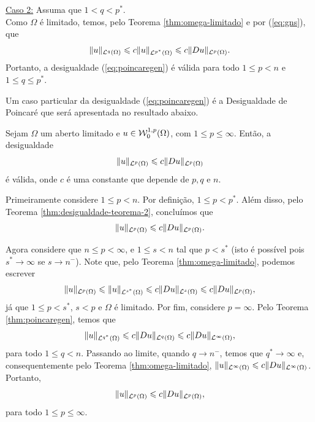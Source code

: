 \begin{prf}
    \underline{Caso 2:} Assuma que $1 < q < p^*$.\\
    Como $\Omega$ é limitado, temos, pelo Teorema \ref{thm:omega-limitado} e por (\ref{eq:gns}), que
    \[
        \Vert u \Vert_{\mathcal{L}^q(\Omega)} \leqslant c\Vert u \Vert_{\mathcal{L}^{p^*}(\Omega)} \leqslant c \Vert Du \Vert_{\mathcal{L}^p(\Omega)}.
    \]
    Portanto, a desigualdade (\ref{eq:poincaregen}) é válida para todo $1 \leqslant p < n$ e $1 \leqslant q \leqslant p^*$.
\end{prf}

Um caso particular da desigualdade (\ref{eq:poincaregen}) é a Desigualdade de Poincaré que será apresentada no resultado abaixo.

\begin{cbox} \label{cl:poincare}
   Sejam $\Omega$ um aberto limitado e $u \in \mathcal{W}^{1,p}_0(\Omega)$, com $1 \leqslant p \leqslant \infty$. Então, a desigualdade
   \[
        \Vert u \Vert_{\mathcal{L}^p(\Omega)} \leqslant c\Vert Du \Vert_{\mathcal{L}^p(\Omega)}
   \]
   é válida,
   onde $c$ é uma constante que depende de $p, q$ e $n$.
\end{cbox}
\begin{prf}
    Primeiramente considere $1 \leqslant p < n$.
    Por definição, $1 \leqslant p < p^*$. Além disso, pelo Teorema \ref{thm:desigualdade-teorema-2}, concluímos que
    \[
        \Vert u \Vert_{\mathcal{L}^p(\Omega)} \leqslant c \Vert Du \Vert_{\mathcal{L}^p(\Omega)}.
    \]

    Agora considere que $n \leqslant p < \infty$, e $1 \leqslant s < n$ tal que $p < s^*$ (isto é possível pois $s^* \to \infty$ se $s \to n^-$).
    Note que, pelo Teorema \ref{thm:omega-limitado}, podemos escrever
    \[
        \Vert u \Vert_{\mathcal{L}^p(\Omega)} \leqslant \Vert u \Vert_{\mathcal{L}^{s^*}(\Omega)} \leqslant c \Vert Du \Vert_{\mathcal{L}^s(\Omega)} \leqslant c \Vert Du \Vert_{\mathcal{L}^p(\Omega)},
    \]
    já que $1 \leqslant p < s^*$, $s < p$ e $\Omega$ é limitado.
    Por fim, considere $p = \infty$.
    Pelo Teorema \ref{thm:poincaregen}, temos que
    \[
        \Vert u \Vert_{\mathcal{L}^{q^*}(\Omega)} \leqslant c \Vert Du \Vert_{\mathcal{L}^{q}(\Omega)} \leqslant c \Vert Du \Vert_{\mathcal{L}^\infty(\Omega)},
    \]
    para todo $1 \leqslant q < n$.
    Passando ao limite, quando $q \to n^-$, temos que $q^* \to \infty$ e, consequentemente pelo Teorema \ref{thm:omega-limitado}, $\Vert u \Vert_{\mathcal{L}^\infty(\Omega)} \leqslant c \Vert Du \Vert_{\mathcal{L}^\infty(\Omega)}$.
    Portanto,
    \[
        \Vert u \Vert_{\mathcal{L}^p(\Omega)} \leqslant c\Vert Du \Vert_{\mathcal{L}^p(\Omega)},
    \]
    para todo $1 \leqslant p \leqslant \infty$.
\end{prf}

